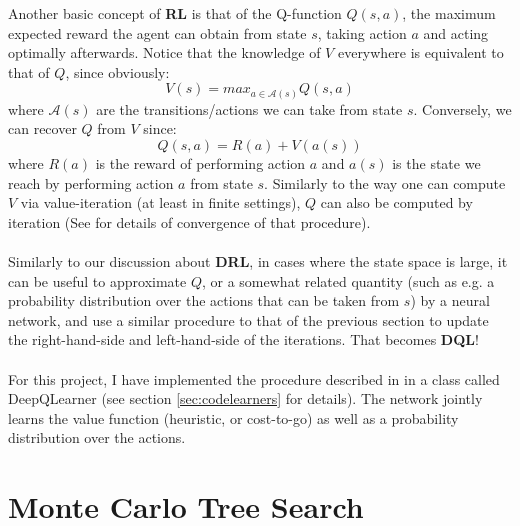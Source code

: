 Another basic concept of \textbf{RL} is that of the Q-function $Q(s, a)$, the maximum expected reward the agent can obtain from state $s$, taking action $a$ and acting optimally afterwards. Notice that the knowledge of $V$ everywhere is equivalent to that of $Q$, since obviously:
\begin{equation} \label{eq:QI}
V(s) = max_{a \in \mathcal{A}(s)} Q(s, a)
\end{equation}
where $\mathcal{A}(s)$ are the transitions/actions we can take from state $s$. Conversely, we can recover $Q$ from $V$ since:
\begin{equation} \label{eq:QI2}
Q(s, a) = R(a) + V(a(s))
\end{equation}
where $R(a)$ is the reward of performing action $a$ and $a(s)$ is the state we reach by performing action $a$ from state $s$. Similarly to the way one can compute $V$ via value-iteration (at least in finite settings), $Q$ can also be computed by iteration (See \cite{Watkins1992} for details of convergence of that procedure).
\\
\\
Similarly to our discussion about \textbf{DRL}, in cases where the state space is large, it can be useful to approximate $Q$, or a somewhat related quantity (such as e.g. a probability distribution over the actions that can be taken from $s$) by a neural network, and use a similar procedure to that of the previous section to update the right-hand-side and left-hand-side of the iterations. That becomes \textbf{DQL}!
\\
\\
For this project, I have implemented the procedure described in \cite{https://doi.org/10.48550/arxiv.1805.07470} in a class called DeepQLearner (see section \ref{sec:codelearners} for details). The network jointly learns the value function (heuristic, or cost-to-go) as well as a probability distribution over the actions.


\section{Monte Carlo Tree Search}

